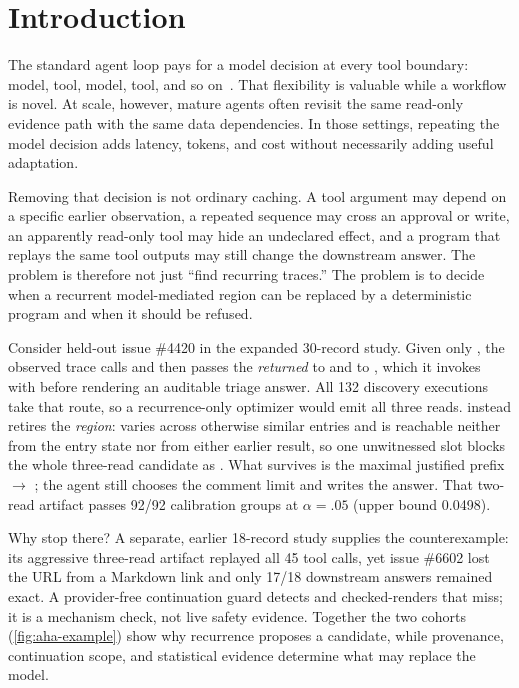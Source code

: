 \section{Introduction}

The standard agent loop pays for a model decision at every tool boundary:
model, tool, model, tool, and so on~\citep{yao2023react}. That flexibility is
valuable while a workflow is novel. At scale, however, mature agents often
revisit the same read-only evidence path with the same data dependencies. In
those settings, repeating the model decision adds latency, tokens, and cost
without necessarily adding useful adaptation.

Removing that decision is not ordinary caching. A tool argument may depend on a
specific earlier observation, a repeated sequence may cross an approval or
write, an apparently read-only tool may hide an undeclared effect, and a
program that replays the same tool outputs may still change the downstream
answer. The problem is therefore not just ``find recurring traces.'' The
problem is to decide when a recurrent model-mediated region can be replaced by a
deterministic program and when it should be refused.

Consider held-out issue \#4420 in the expanded 30-record study. Given only
, the observed trace calls  and then
passes the \emph{returned}  to  and to
, which it invokes with  before rendering an
auditable triage answer. All 132 discovery executions take that route, so a
recurrence-only optimizer would emit all three reads. \method instead retires
the \emph{region}:  varies across otherwise similar entries
and is reachable neither from the entry state nor from either earlier result, so
one unwitnessed slot blocks the whole three-read candidate as
. What survives is the maximal justified prefix
 $\rightarrow$ ; the agent still chooses the comment
limit and writes the answer. That two-read artifact passes 92/92 calibration
groups at $\alpha=.05$ (upper bound 0.0498).

Why stop there? A separate, earlier 18-record study supplies the counterexample:
its aggressive three-read artifact replayed all 45 tool calls, yet issue \#6602
lost the URL from a Markdown link and only 17/18 downstream answers remained
exact. A provider-free continuation guard detects and checked-renders that miss;
it is a mechanism check, not live safety evidence. Together the two cohorts
(\cref{fig:aha-example}) show why recurrence proposes a candidate, while
provenance, continuation scope, and statistical evidence determine what may
replace the model.

